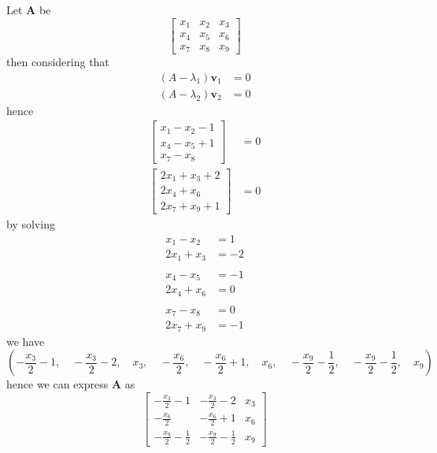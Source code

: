 \documentclass[12pt]{article}
\newcommand{\matr}[1]{\mathbf{#1}}
\newenvironment{answer}[2][Answer]{\begin{trivlist}
    \item[\hskip \labelsep {\bfseries #1}\hskip \labelsep {\bfseries #2.}]}{\end{trivlist}}
\begin{document}
\begin{answer}{Q. 2}
\end{answer}
Let $\matr A$ be 
\begin{equation}
	\left[\begin{matrix}x_{1} & x_{2} & x_{3}\\x_{4} & x_{5} & x_{6}\\x_{7} & x_{8} & x_{9}\end{matrix}\right]
\end{equation}
then considering that 
\begin{align} 
	(A-\lambda_1)\matr v_1 & =0 \\
	(A-\lambda_2)\matr v_2 & =0 
\end{align}
hence
\begin{align} 
	\left[\begin{matrix}x_{1} - x_{2} - 1   \\x_{4} - x_{5} + 1\\x_{7} - x_{8}\end{matrix}\right] &= 0 \\
	\left[\begin{matrix}2 x_{1} + x_{3} + 2 \\2 x_{4} + x_{6}\\2 x_{7} + x_{9} + 1\end{matrix}\right] &= 0
\end{align}
by solving 
\begin{align}
	x_1-x_2    & =1   \\
	2x_1+x_3   & = -2 \\ \\
	x_4-x_5    & = -1 \\
	2x_4 + x_6 & = 0  \\ \\
	x_7-x_8    & = 0  \\
	2x_7+x_9   & = -1 
\end{align}
we have
\begin{equation}
	\left ( - \frac{x_{3}}{2} - 1, \quad - \frac{x_{3}}{2} - 2, \quad x_{3}, \quad - \frac{x_{6}}{2}, \quad - \frac{x_{6}}{2} + 1, \quad x_{6}, \quad - \frac{x_{9}}{2} - \frac{1}{2}, \quad - \frac{x_{9}}{2} - \frac{1}{2}, \quad x_{9}\right )
\end{equation}
hence we can express $\matr A$ as
\begin{equation}
	\left[\begin{matrix}- \frac{x_{3}}{2} - 1 & - \frac{x_{3}}{2} - 2 & x_{3}\\- \frac{x_{6}}{2} & - \frac{x_{6}}{2} + 1 & x_{6}\\- \frac{x_{9}}{2} - \frac{1}{2} & - \frac{x_{9}}{2} - \frac{1}{2} & x_{9}\end{matrix}\right]
\end{equation}
\end{document}
